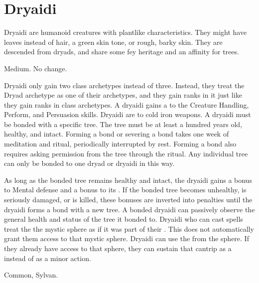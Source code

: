 \section{Dryaidi}\label{Dryaidi}

  Dryaidi are humanoid creatures with plantlike characteristics.
  They might have leaves instead of hair, a green skin tone, or rough, barky skin.
  They are descended from dryads, and share some fey heritage and an affinity for trees.

   Medium.
   No change.
  \begin{raggeditemize}
     Dryaidi only gain two class archetypes instead of three.
      Instead, they treat the Dryad archetype as one of their archetypes, and they gain ranks in it just like they gain ranks in class archetypes.
     A dryaidi gains a   to the Creature Handling, Perform, and Persuasion skills.
     Dryaidi are \vulnerable to cold iron weapons.
     A dryaidi must be bonded with a specific tree.
      The tree must be at least a hundred years old, healthy, and intact.
      Forming a bond or severing a bond takes one week of meditation and ritual, periodically interrupted by rest.
      Forming a bond also requires asking permission from the tree through the ritual.
      Any individual tree can only be bonded to one dryad or dryaidi in this way.

      As long as the bonded tree remains healthy and intact, the dryaidi gains a  bonus to Mental defense and a  bonus to its .
      If the bonded tree becomes unhealthy, is seriously damaged, or is killed, these bonuses are inverted into penalties until the dryaidi forms a bond with a new tree.
      A bonded dryaidi can passively observe the general health and status of the tree it bonded to.
     Dryaidi who can cast spells treat the the  mystic sphere as if it was part of their .
      This does not automatically grant them access to that mystic sphere.
     Dryaidi can use the   from the  sphere.
      If they already have access to that sphere, they can sustain that cantrip as a  instead of as a minor action.
  \end{raggeditemize}
   Common, Sylvan.

